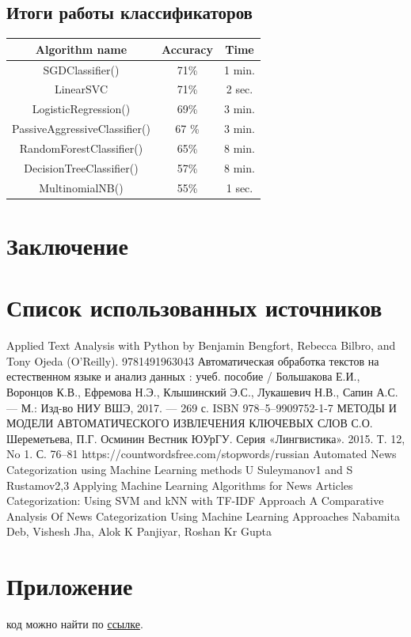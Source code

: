 \documentclass{article}
\newcommand\tab[1][1cm]{\hspace*{#1}}
\begin{document}
\subsection{Итоги работы классификаторов}
\begin{center}
\begin{tabular}{||c | c | c||} 
\hline
 Algorithm name & Accuracy & Time \\ [0s.5ex] 
 \hline\hline
 SGDClassifier() & 71\% & 1 min.\\ 
  \hline
 LinearSVC & 71\% & 2 sec. \\  
 \hline
 LogisticRegression() & 69\% & 3 min. \\   
 \hline
 PassiveAggressiveClassifier() &67 \% &  3 min.\\
 \hline
 RandomForestClassifier() & 65\% & 8 min.\\ 
 \hline
 DecisionTreeClassifier() & 57\% & 8 min.\\
 \hline
 MultinomialNB() & 55\% & 1 sec.\\ 
  [1ex] 
 \hline
\end{tabular}
\end{center}
\newpage
{}
\section*{Заключение}
\newpage
{}
\section*{Список использованных источников}
\renewcommand{\refname}{}
\begin{thebibliography}{7}
 Applied Text Analysis with Python by Benjamin Bengfort, Rebecca Bilbro, and Tony Ojeda (O’Reilly). 978­1­491­96304­3
 Автоматическая обработка текстов на естественном языке и анализ данных : учеб. пособие / Большакова Е.И., Воронцов К.В., Ефремова Н.Э., Клышинский Э.С., Лукашевич Н.В., Сапин А.С. — М.: Изд-во НИУ ВШЭ, 2017. — 269 с. ISBN 978–5–9909752-1-7
МЕТОДЫ И МОДЕЛИ АВТОМАТИЧЕСКОГО ИЗВЛЕЧЕНИЯ КЛЮЧЕВЫХ СЛОВ С.О. Шереметьева, П.Г. Осминин Вестник ЮУрГУ. Серия «Лингвистика». 2015. Т. 12, No 1. С. 76–81
https://countwordsfree.com/stopwords/russian
Automated News Categorization using Machine Learning
methods
U Suleymanov1
 and S Rustamov2,3
 Applying Machine Learning Algorithms for News Articles Categorization: Using SVM and kNN with TF-IDF Approach
 A Comparative Analysis Of News Categorization
Using Machine Learning Approaches
Nabamita Deb, Vishesh Jha, Alok K Panjiyar, Roshan Kr Gupta
\end{thebibliography}
\newpage
{}
\section*{Приложение}
 код можно найти по \href{https://github.com/dokapoka/paper_text_classification}{ссылке}.

 
\end{document}

